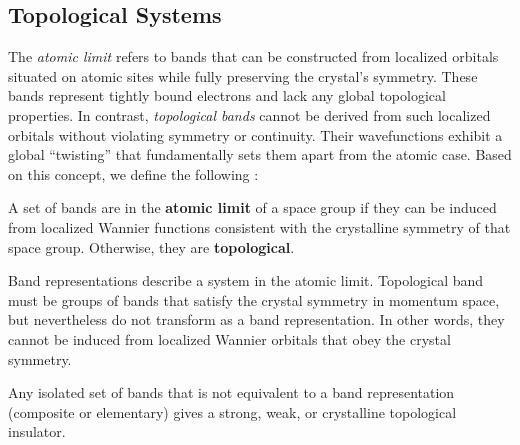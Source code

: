 \documentclass[12pt]{report}
\begin{document}
%

\subsection{Topological Systems} \label{subsec:topological_systems}

The \textit{atomic limit} refers to bands that can be constructed from localized orbitals situated on atomic sites while fully preserving the crystal's symmetry. These bands represent tightly bound electrons and lack any global topological properties. In contrast, \textit{topological bands} cannot be derived from such localized orbitals without violating symmetry or continuity. Their wavefunctions exhibit a global ``twisting'' that fundamentally sets them apart from the atomic case. Based on this concept, we define the following \cite{building_blocks2018}:

\begin{definition}
A set of bands are in the \textbf{atomic limit} of a space group if they can be induced from localized Wannier functions consistent with the crystalline symmetry of that space group. Otherwise, they are \textbf{topological}.
\end{definition}

Band representations describe a system in the atomic limit. Topological band must be groups of bands that satisfy the crystal symmetry in momentum space, but nevertheless do not transform as a band representation. In other words, they cannot be induced from localized Wannier orbitals that obey the crystal symmetry.

\begin{theorem} \label{th:topo_insul}
Any isolated set of bands that is not equivalent to a band representation (composite or elementary) gives a strong, weak, or crystalline topological insulator.
\end{theorem}
\end{document}
